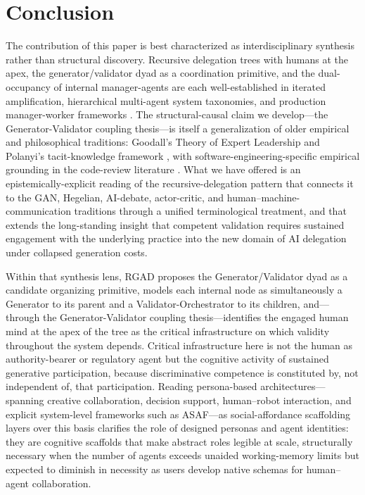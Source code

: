 \documentclass[11pt,a4paper]{article}
\begin{document}
\section{Conclusion}
The contribution of this paper is best characterized as interdisciplinary synthesis rather than structural discovery. Recursive delegation trees with humans at the apex, the generator/validator dyad as a coordination primitive, and the dual-occupancy of internal manager-agents are each well-established in iterated amplification, hierarchical multi-agent system taxonomies, and production manager-worker frameworks \citep{christiano2018ida, christiano2016hch, moore2025, hong2024metagpt}. The structural-causal claim we develop---the Generator-Validator coupling thesis---is itself a generalization of older empirical and philosophical traditions: Goodall's Theory of Expert Leadership \citep{goodall2011} and Polanyi's tacit-knowledge framework \citep{polanyi1966}, with software-engineering-specific empirical grounding in the code-review literature \citep{bacchelli2013}. What we have offered is an epistemically-explicit reading of the recursive-delegation pattern that connects it to the GAN, Hegelian, AI-debate, actor-critic, and human--machine-communication traditions through a unified terminological treatment, and that extends the long-standing insight that competent validation requires sustained engagement with the underlying practice into the new domain of AI delegation under collapsed generation costs.

Within that synthesis lens, RGAD proposes the Generator/Validator dyad as a candidate organizing primitive, models each internal node as simultaneously a Generator to its parent and a Validator-Orchestrator to its children, and---through the Generator-Validator coupling thesis---identifies the engaged human mind at the apex of the tree as the critical infrastructure on which validity throughout the system depends. Critical infrastructure here is not the human as authority-bearer or regulatory agent but the cognitive activity of sustained generative participation, because discriminative competence is constituted by, not independent of, that participation. Reading persona-based architectures---spanning creative collaboration, decision support, human--robot interaction, and explicit system-level frameworks such as ASAF---as social-affordance scaffolding layers over this basis clarifies the role of designed personas and agent identities: they are cognitive scaffolds that make abstract roles legible at scale, structurally necessary when the number of agents exceeds unaided working-memory limits but expected to diminish in necessity as users develop native schemas for human--agent collaboration.
\end{document}

